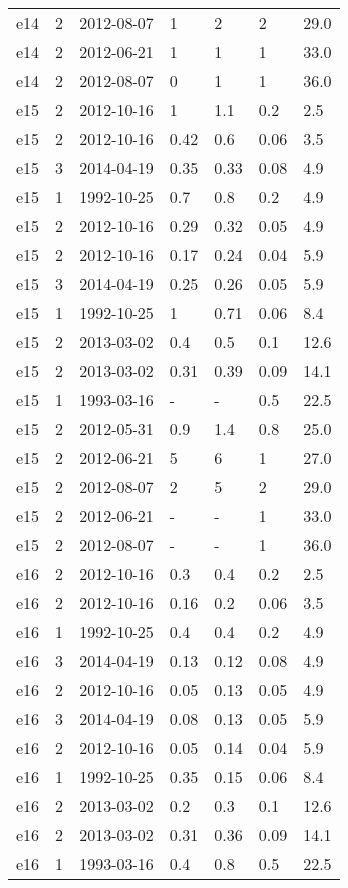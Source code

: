 \begin{table*}[htp]
\begin{tabular}{llll}
e14 & 2 & 2012-08-07 & 1 & 2 & 2 & 29.0 \\
e14 & 2 & 2012-06-21 & 1 & 1 & 1 & 33.0 \\
e14 & 2 & 2012-08-07 & 0 & 1 & 1 & 36.0 \\
e15 & 2 & 2012-10-16 & 1 & 1.1 & 0.2 & 2.5 \\
e15 & 2 & 2012-10-16 & 0.42 & 0.6 & 0.06 & 3.5 \\
e15 & 3 & 2014-04-19 & 0.35 & 0.33 & 0.08 & 4.9 \\
e15 & 1 & 1992-10-25 & 0.7 & 0.8 & 0.2 & 4.9 \\
e15 & 2 & 2012-10-16 & 0.29 & 0.32 & 0.05 & 4.9 \\
e15 & 2 & 2012-10-16 & 0.17 & 0.24 & 0.04 & 5.9 \\
e15 & 3 & 2014-04-19 & 0.25 & 0.26 & 0.05 & 5.9 \\
e15 & 1 & 1992-10-25 & 1 & 0.71 & 0.06 & 8.4 \\
e15 & 2 & 2013-03-02 & 0.4 & 0.5 & 0.1 & 12.6 \\
e15 & 2 & 2013-03-02 & 0.31 & 0.39 & 0.09 & 14.1 \\
e15 & 1 & 1993-03-16 & - & - & 0.5 & 22.5 \\
e15 & 2 & 2012-05-31 & 0.9 & 1.4 & 0.8 & 25.0 \\
e15 & 2 & 2012-06-21 & 5 & 6 & 1 & 27.0 \\
e15 & 2 & 2012-08-07 & 2 & 5 & 2 & 29.0 \\
e15 & 2 & 2012-06-21 & - & - & 1 & 33.0 \\
e15 & 2 & 2012-08-07 & - & - & 1 & 36.0 \\
e16 & 2 & 2012-10-16 & 0.3 & 0.4 & 0.2 & 2.5 \\
e16 & 2 & 2012-10-16 & 0.16 & 0.2 & 0.06 & 3.5 \\
e16 & 1 & 1992-10-25 & 0.4 & 0.4 & 0.2 & 4.9 \\
e16 & 3 & 2014-04-19 & 0.13 & 0.12 & 0.08 & 4.9 \\
e16 & 2 & 2012-10-16 & 0.05 & 0.13 & 0.05 & 4.9 \\
e16 & 3 & 2014-04-19 & 0.08 & 0.13 & 0.05 & 5.9 \\
e16 & 2 & 2012-10-16 & 0.05 & 0.14 & 0.04 & 5.9 \\
e16 & 1 & 1992-10-25 & 0.35 & 0.15 & 0.06 & 8.4 \\
e16 & 2 & 2013-03-02 & 0.2 & 0.3 & 0.1 & 12.6 \\
e16 & 2 & 2013-03-02 & 0.31 & 0.36 & 0.09 & 14.1 \\
e16 & 1 & 1993-03-16 & 0.4 & 0.8 & 0.5 & 22.5 \\

\end{tabular}
\end{table*}
